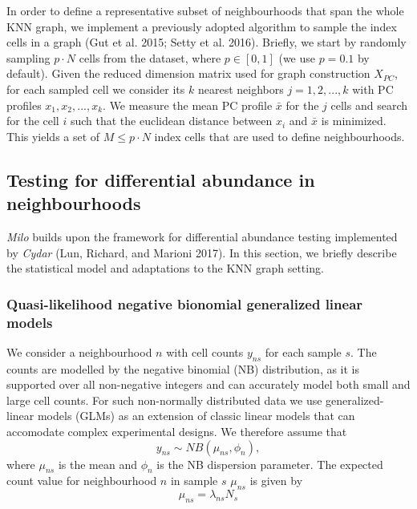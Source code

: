 \documentclass[
]{article}
\begin{document}
In order to define a representative subset of neighbourhoods that span
the whole KNN graph, we implement a previously adopted algorithm to
sample the index cells in a graph (Gut et al. 2015; Setty et al. 2016).
Briefly, we start by randomly sampling \(p \cdot N\) cells from the
dataset, where \(p \in [0,1]\) (we use \(p = 0.1\) by default). Given
the reduced dimension matrix used for graph construction \(X_{PC}\), for
each sampled cell we consider its \(k\) nearest neighbors
\(j = 1,2,...,k\) with PC profiles \({x_1, x_2, ... , x_k}\). We measure
the mean PC profile \(\bar{x}\) for the \(j\) cells and search for the
cell \(i\) such that the euclidean distance between \(x_i\) and
\(\bar{x}\) is minimized. This yields a set of \(M \leq p \cdot N\)
index cells that are used to define neighbourhoods.

\hypertarget{testing-for-differential-abundance-in-neighbourhoods}{%
\subsection{Testing for differential abundance in
neighbourhoods}\label{testing-for-differential-abundance-in-neighbourhoods}}

\emph{Milo} builds upon the framework for differential abundance testing
implemented by \emph{Cydar} (Lun, Richard, and Marioni 2017). In this
section, we briefly describe the statistical model and adaptations to
the KNN graph setting.

\hypertarget{quasi-likelihood-negative-bionomial-generalized-linear-models}{%
\subsubsection{Quasi-likelihood negative bionomial generalized linear
models}\label{quasi-likelihood-negative-bionomial-generalized-linear-models}}

We consider a neighbourhood \(n\) with cell counts \(y_{ns}\) for each
sample \(s\). The counts are modelled by the negative binomial (NB)
distribution, as it is supported over all non-negative integers and can
accurately model both small and large cell counts. For such non-normally
distributed data we use generalized-linear models (GLMs) as an extension
of classic linear models that can accomodate complex experimental
designs. We therefore assume that \[
y_{ns} \sim NB(\mu_{ns},\phi_{n}),
\] where \(\mu_{ns}\) is the mean and \(\phi_{n}\) is the NB dispersion
parameter. The expected count value for neighbourhood \(n\) in sample
\(s\) \(\mu_{ns}\) is given by \[
\mu_{ns} = \lambda_{ns}N_s
\]
\end{document}
